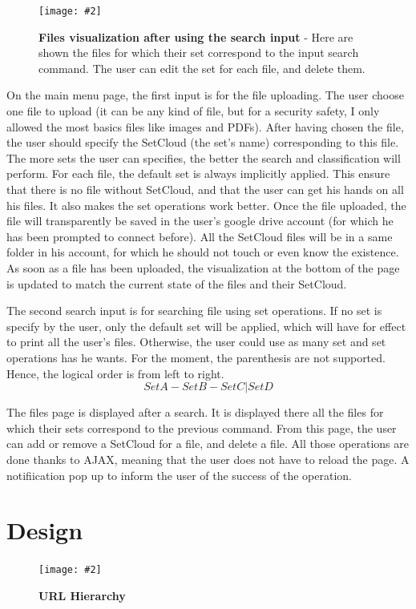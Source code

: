 \documentclass[10pt, a4paper]{article}
\newcommand{\figuremacro}[5]{
    \begin{figure}[#1]
        \centering
        \texttt{[image: \#2]}
        \caption[#3]{\textbf{#3}#4}
        \label{fig:#2}
    \end{figure}
}
\begin{document}
\figuremacro{h}{files}{Files visualization after using the search input}{ - Here are shown the files for which their set correspond to the input search command. The user can edit the set for each file, and delete them.}{1.0}

On the main menu page, the first input is for the file uploading. The user choose one file to upload (it can be any kind of file, but for a security safety, I only allowed the most basics files like images and PDFs). After having chosen the file, the user should specify the SetCloud (the set's name) corresponding to this file. The more sets the user can specifies, the better the search and classification will perform. For each file, the default set is always implicitly applied. This ensure that there is no file without SetCloud, and that the user can get his hands on all his files. It also makes the set operations work better. Once the file uploaded, the file will transparently be saved in the user's google drive account (for which he has been prompted to connect before). All the SetCloud files will be in a same folder in his account, for which he should not touch or even know the existence. As soon as a file has been uploaded, the visualization at the bottom of the page is updated to match the current state of the files and their SetCloud.

The second search input is for searching file using set operations. If no set is specify by the user, only the default set will be applied, which will have for effect to print all the user's files. Otherwise, the user could use as many set and set operations has he wants. For the moment, the parenthesis are not supported. Hence, the logical order is from left to right.
\begin{equation}
SetA - SetB - SetC | SetD
\end{equation}

The files page is displayed after a search. It is displayed there all the files for which their sets correspond to the previous command. From this page, the user can add or remove a SetCloud for a file, and delete a file. All those operations are done thanks to AJAX, meaning that the user does not have to reload the page. A notifiication pop up to inform the user of the success of the operation.

\section{Design}

\figuremacro{h}{url_hierarchy}{URL Hierarchy}{}{1.0}
\end{document}
